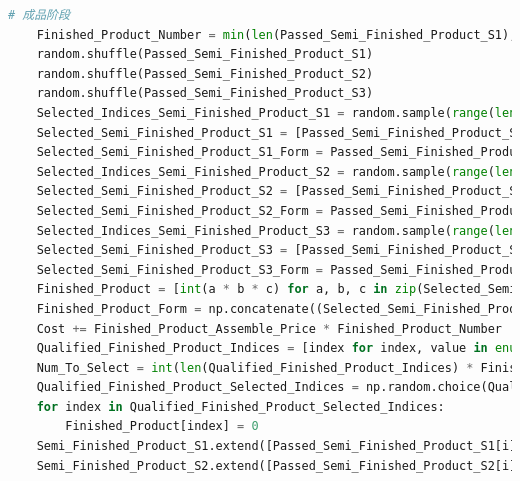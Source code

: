 \documentclass[withoutpreface,bwprint]{cumcmthesis} %
\begin{document}
\begin{appendices}
\begin{lstlisting}[language=python]
    # 成品阶段
    Finished_Product_Number = min(len(Passed_Semi_Finished_Product_S1), len(Passed_Semi_Finished_Product_S2), len(Passed_Semi_Finished_Product_S3))
    random.shuffle(Passed_Semi_Finished_Product_S1)
    random.shuffle(Passed_Semi_Finished_Product_S2)
    random.shuffle(Passed_Semi_Finished_Product_S3)
    Selected_Indices_Semi_Finished_Product_S1 = random.sample(range(len(Passed_Semi_Finished_Product_S1)), Finished_Product_Number)
    Selected_Semi_Finished_Product_S1 = [Passed_Semi_Finished_Product_S1[i] for i in Selected_Indices_Semi_Finished_Product_S1]
    Selected_Semi_Finished_Product_S1_Form = Passed_Semi_Finished_Product_S1_Form[:, Selected_Indices_Semi_Finished_Product_S1]
    Selected_Indices_Semi_Finished_Product_S2 = random.sample(range(len(Passed_Semi_Finished_Product_S2)), Finished_Product_Number)
    Selected_Semi_Finished_Product_S2 = [Passed_Semi_Finished_Product_S2[i] for i in Selected_Indices_Semi_Finished_Product_S2]
    Selected_Semi_Finished_Product_S2_Form = Passed_Semi_Finished_Product_S2_Form[:, Selected_Indices_Semi_Finished_Product_S2]
    Selected_Indices_Semi_Finished_Product_S3 = random.sample(range(len(Passed_Semi_Finished_Product_S3)), Finished_Product_Number)
    Selected_Semi_Finished_Product_S3 = [Passed_Semi_Finished_Product_S3[i] for i in Selected_Indices_Semi_Finished_Product_S3]
    Selected_Semi_Finished_Product_S3_Form = Passed_Semi_Finished_Product_S3_Form[:, Selected_Indices_Semi_Finished_Product_S3]
    Finished_Product = [int(a * b * c) for a, b, c in zip(Selected_Semi_Finished_Product_S1, Selected_Semi_Finished_Product_S2, Selected_Semi_Finished_Product_S3)]
    Finished_Product_Form = np.concatenate((Selected_Semi_Finished_Product_S1_Form, Selected_Semi_Finished_Product_S2_Form, Selected_Semi_Finished_Product_S3_Form), axis=0)
    Cost += Finished_Product_Assemble_Price * Finished_Product_Number
    Qualified_Finished_Product_Indices = [index for index, value in enumerate(Finished_Product) if value == 1]
    Num_To_Select = int(len(Qualified_Finished_Product_Indices) * Finished_Product_Defect_Rate)
    Qualified_Finished_Product_Selected_Indices = np.random.choice(Qualified_Finished_Product_Indices, size=Num_To_Select, replace=False)
    for index in Qualified_Finished_Product_Selected_Indices:
        Finished_Product[index] = 0
    Semi_Finished_Product_S1.extend([Passed_Semi_Finished_Product_S1[i] for i in range(len(Passed_Semi_Finished_Product_S1)) if i not in Selected_Indices_Semi_Finished_Product_S1])
    Semi_Finished_Product_S2.extend([Passed_Semi_Finished_Product_S2[i] for i in range(len(Passed_Semi_Finished_Product_S2)) if i not in Selected_Indices_Semi_Finished_Product_S2])

\end{lstlisting}
\end{appendices}
\end{document}
